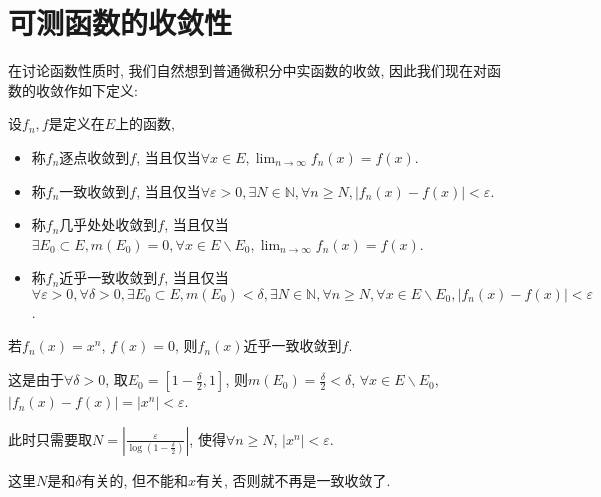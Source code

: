 \documentclass[theorem=false,mathfont=none,openany,sub3section]{easybook}
\begin{document}
\newpage

\section{可测函数的收敛性}

在讨论函数性质时, 我们自然想到普通微积分中实函数的收敛, 因此我们现在对函数的收敛作如下定义:\par

\begin{definition}
  设$f_n,f$是定义在$E$上的函数, 
  \begin{itemize}
    \item 称$f_n$逐点收敛到$f$, 当且仅当$\forall x\in E, \lim_{n \to \infty}f_n(x)=f(x)$.\par
    \item 称$f_n$一致收敛到$f$, 当且仅当$\forall \varepsilon>0, \exists N\in \mathbb{N}, \forall n\geqslant N, |f_n(x)-f(x)|<\varepsilon$.\par
    \item 称$f_n$几乎处处收敛到$f$, 当且仅当$\exists E_0\subset E, m(E_0) = 0, \forall x\in E\backslash E_0, \lim_{n \to \infty}f_n(x)=f(x)$.\par
    \item 称$f_n$近乎一致收敛到$f$, 当且仅当$\forall \varepsilon>0, \forall \delta > 0, \exists E_0\subset E, m(E_0) < \delta, \exists N\in \mathbb{N}, \forall n\geqslant N, \forall x\in E\backslash E_0, |f_n(x)-f(x)|<\varepsilon$.\par
  \end{itemize}
\end{definition}

\begin{example}
  若$f_n(x)=x^n$, $f(x)=0$, 则$f_n(x)$近乎一致收敛到$f$.\par
  这是由于$\forall \delta>0$, 取$E_0 =\left[1-\frac{\delta}{2},1\right]$, 则$m(E_0)=\frac{\delta}{2}<\delta$, $\forall x\in E\backslash E_0$, $|f_n(x)-f(x)|=|x^n|<\varepsilon$.\par
  此时只需要取$N=\left|\frac{\varepsilon}{\log \left(1-\frac{\delta}{2}\right)}\right|$, 使得$\forall n\geqslant N$, $|x^n|<\varepsilon$.\par
\end{example}

\begin{remark}
  这里$N$是和$\delta$有关的, 但不能和$x$有关, 否则就不再是一致收敛了.\par
\end{remark}
\end{document}
